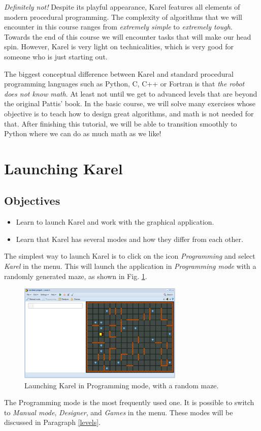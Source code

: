{\em Definitely not!} Despite its playful appearance, Karel features all elements 
of modern procedural programming. The complexity of algorithms 
that we will encounter in this course ranges from {\em extremely simple} 
to {\em extremely tough}. Towards the end of this course we will encounter 
tasks that will make our head spin. However, Karel is very light on 
technicalities, which is very good for someone who is just starting out.

The biggest conceptual difference between Karel and standard procedural
programming languages such as Python, C, C++ or Fortran is that {\em the robot does not 
know math}. At least not until we get to advanced levels that are beyond 
the original Pattis' book. In the basic course, we will solve many exercises 
whose objective is to teach how to design great algorithms, and math is 
not needed for that. After finishing this tutorial, we will be able to transition 
smoothly to Python where we can do as much math as we like!
 
\section{Launching Karel}

\subsection{Objectives} 
\begin{itemize}
\item Learn to launch Karel and work with the graphical application.
\item Learn that Karel has several modes and how they differ from each other.
\end{itemize}
\noindent
The simplest way to launch Karel is to click on the icon 
{\em Programming} and select {\em Karel} in the menu. This will launch the application 
in {\em Programming mode} with a randomly generated maze, as shown in Fig. \ref{fig:init}.

\begin{figure}[!ht]
\begin{center}
\includegraphics[width=0.7\textwidth]{imgk/init.png}
\end{center}
\vspace{-2mm}
\caption{Launching Karel in Programming mode, with a random maze.}
\label{fig:init}
\vspace{-10mm}
\end{figure}
\newpage
\noindent
The Programming mode is the most frequently used one. It is possible to 
switch to {\em Manual mode}, {\em Designer}, and {\em Games} in the menu. 
These modes will be discussed in Paragraph \ref{levels}.

